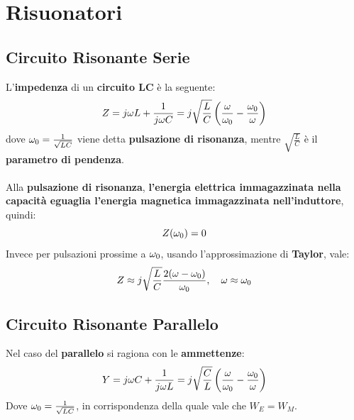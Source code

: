 \chapter{Risuonatori}
\section{Circuito Risonante Serie}
L'\textbf{impedenza} di un \textbf{circuito LC} è la seguente:
\begin{equation*}
    Z = j\omega L + \frac{1}{j\omega C} = j \sqrt{\frac{L}{C}} \left(\frac{\omega}{\omega_0}- \frac{\omega_0}{\omega}\right)
\end{equation*}
dove $\omega_0 = \frac{1}{\sqrt{LC}}$ viene detta \textbf{pulsazione di risonanza}, mentre $\sqrt{\frac{L}{C}}$ è il \textbf{parametro di pendenza}.\\ \\
Alla \textbf{pulsazione di risonanza},\textbf{ l'energia elettrica immagazzinata nella capacità eguaglia l'energia magnetica immagazzinata nell'induttore}, quindi:
\begin{equation*}
    Z(\omega_0) = 0
\end{equation*}
Invece per pulsazioni prossime a $\omega_0$, usando l'approssimazione di \textbf{Taylor}, vale:
\begin{equation*}
    Z \approx j \sqrt{\frac{L}{C}} \frac{2(\omega - \omega_0)}{\omega_0}, \quad \omega \approx \omega_0
\end{equation*}

\section{Circuito Risonante Parallelo}
Nel caso del \textbf{parallelo} si ragiona con le \textbf{ammettenze}:
\begin{equation*}
    Y = j \omega C + \frac{1}{j \omega L} = j \sqrt{\frac{C}{L}} \left(\frac{\omega}{\omega_0} - \frac{\omega_0}{\omega}\right)
\end{equation*}
Dove $\omega_0 = \frac{1}{\sqrt{LC}}$, in corrispondenza della quale vale che $W_E = W_M$.

